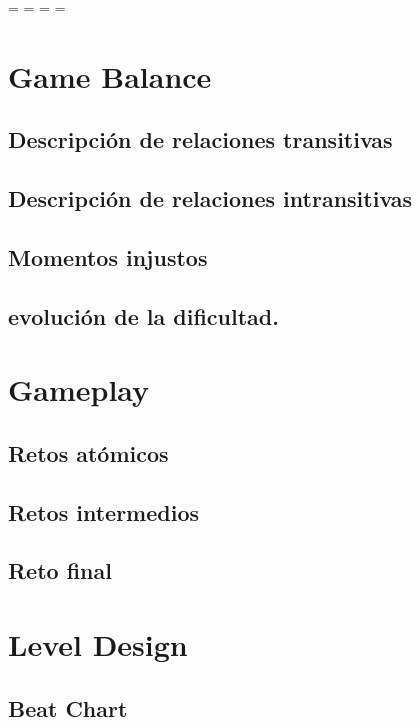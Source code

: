     \endgroup
    \newpage
    \addtolength\headwidth{-1\mtL}
    \paperwidth=\pdfpageheight
    \paperheight=\pdfpagewidth
    \pdfpageheight=\paperheight
    \pdfpagewidth=\paperwidth

\section{Game Balance}
    \subsection{Descripción de relaciones transitivas}
    \subsection{Descripción de relaciones intransitivas}
    \subsection{Momentos injustos}
    \subsection{ evolución de la dificultad.}

\section{Gameplay}
    \subsection{Retos atómicos}
    \subsection{Retos intermedios }
    \subsection{Reto final}

\section{Level Design} \label{levelDesign}
    \subsection{Beat Chart}
